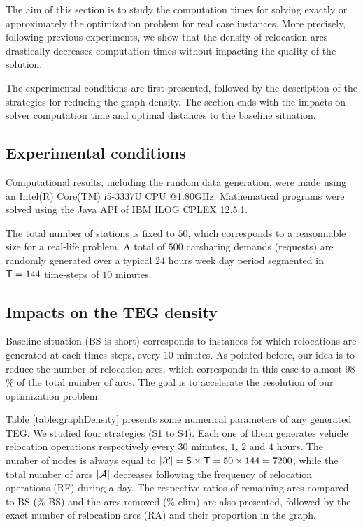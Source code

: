 \bigskip
The aim of this section is to study the computation times for solving exactly or approximately the optimization problem for real case instances.
More precisely, following previous experiments, we show that the density of relocation arcs drastically decreases computation times without impacting the quality of the solution.

\bigskip
The experimental conditions are first presented, followed by the description of the strategies for reducing the graph density.
The section ends with the impacts on solver computation time and optimal distances to the baseline situation. 

\subsection{Experimental conditions}
Computational results, including the random data generation, were made using an Intel(R) Core(TM) i5-3337U CPU @1.80GHz.
Mathematical programs were solved using the Java API of IBM ILOG CPLEX 12.5.1.

\bigskip
The total number of stations is fixed to $50$, which corresponds to a reasonnable size for a real-life problem.
A total of $500$ carsharing demands (requests) are randomly generated over a typical $24$ hours week day period segmented in $\mathsf{T} = 144$ time-steps of $10$ minutes.

\subsection{Impacts on the TEG density}
Baseline situation (BS is short) corresponds to instances for which relocations are generated at each times steps, \ie every $10$ minutes.
As pointed before, our idea is to reduce the number of relocation arcs, which corresponds in this case to almost $98$\% of the total number of arcs.
The goal is to accelerate the resolution of our optimization problem.

\bigskip
Table \ref{table:graphDensity} presents some numerical parameters of any generated TEG.
We studied four strategies (S1 to S4).
Each one of them generates vehicle relocation operations respectively every $30$ minutes, $1$, $2$ and $4$ hours. 
The number of nodes is always equal to $|\mathcal{X}| = \mathsf{S} \times \mathsf{T} = 50 \times 144 = 7200$, while the total number of arcs $|\mathcal{A}|$ decreases following the frequency of relocation operations (RF) during a day.
The respective ratios of remaining arcs compared to BS (\% BS) and the arcs removed (\% elim) are also presented, followed by the exact number of relocation arcs (RA) and their proportion in the graph.

